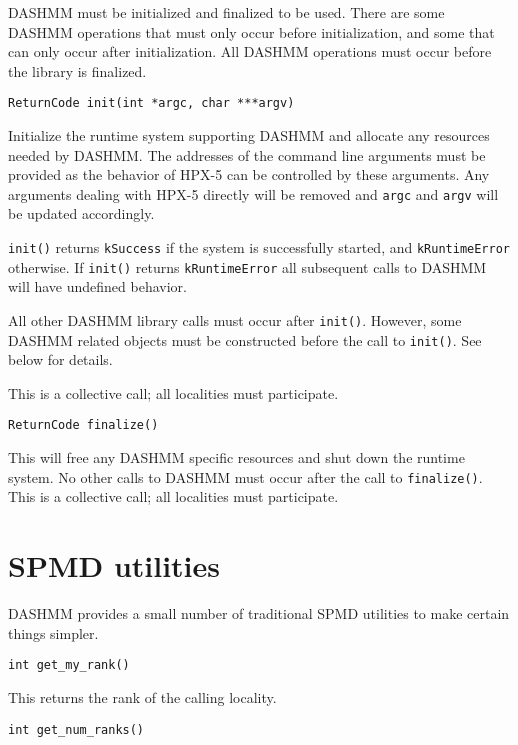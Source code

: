 DASHMM must be initialized and finalized to be used. There are some DASHMM
operations that must only occur before initialization, and some that can only
occur after initialization. All DASHMM operations must occur before the
library is finalized.

\begin{lstlisting}
ReturnCode init(int *argc, char ***argv)
\end{lstlisting}

\noindent Initialize the runtime system supporting DASHMM and allocate any
resources needed by DASHMM. The addresses of the command line arguments must be
provided as the behavior of HPX-5 can be controlled by these arguments. Any
arguments dealing with HPX-5 directly will be removed and \texttt{argc} and
\texttt{argv} will be updated accordingly.

\texttt{init()} returns \texttt{kSuccess} if the system is successfully
started, and \texttt{kRuntimeError} otherwise. If \texttt{init()} returns
\texttt{kRuntimeError} all subsequent calls to DASHMM will have undefined
behavior.

All other DASHMM library calls must occur after \texttt{init()}. However, some
DASHMM related objects must be constructed before the call to \texttt{init()}.
See below for details.

This is a collective call; all localities must participate.

\begin{lstlisting}
ReturnCode finalize()
\end{lstlisting}

\noindent This will free any DASHMM specific resources and shut down the
runtime system. No other calls to DASHMM must occur after the call to
\texttt{finalize()}. This is a collective call; all localities must
participate.


\section{SPMD utilities}

DASHMM provides a small number of traditional SPMD utilities to make certain
things simpler.

\begin{lstlisting}
int get_my_rank()
\end{lstlisting}

\noindent This returns the rank of the calling locality.

\begin{lstlisting}
int get_num_ranks()
\end{lstlisting}

